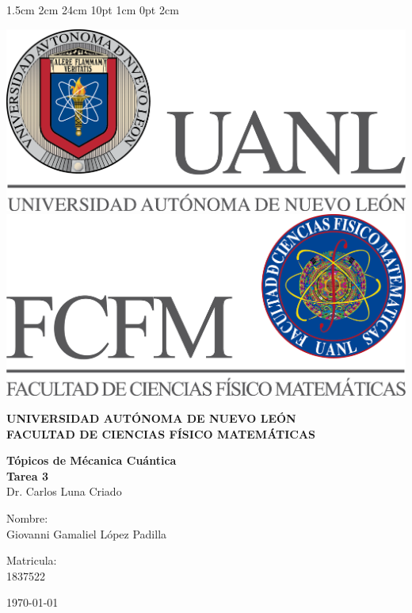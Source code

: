 \documentclass[12pt,letterpaper]{report}
\begin{document}
\setmargins{2.5cm}      
{1.5cm}                     
{2cm}  
{24cm}                    
{10pt}                          
{1cm}                          
{0pt}                             
{2cm}
\begin{titlepage}
\begin{center}
\includegraphics[scale=0.40]{../../Logos/uanl.png} 
\hspace{2.5cm}
\includegraphics[scale=0.40]{../../Logos/fcfm.png}
\end{center}
\vspace{2cm}
\begin{center}
\textbf{
UNIVERSIDAD AUTÓNOMA DE NUEVO LEÓN\\
FACULTAD DE CIENCIAS
    FÍSICO MATEMÁTICAS}\\
\vspace*{2cm}
\begin{large}
\vspace{1cm}
\large{\textbf{Tópicos de Mécanica Cuántica}}\\
\textbf{Tarea 3}\\
Dr. Carlos Luna Criado\\
\end{large}
\vspace{3.5cm}
\begin{minipage}{0.6\linewidth}
\vspace{0.5cm}
\changefontsizes{14pt}
Nombre:\\
Giovanni Gamaliel López Padilla\\
\end{minipage}
\begin{minipage}{0.2\linewidth}
\changefontsizes{14pt}
Matricula:\\
1837522
\end{minipage}
\end{center}
\vspace{4cm}
\begin{flushright}
\today
\end{flushright}
\end{titlepage}
\end{document}
